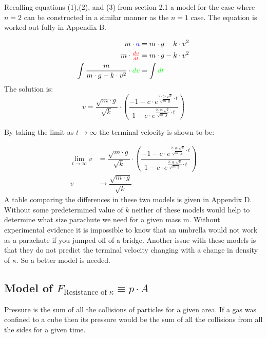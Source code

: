 \documentclass[12pt,letterpaper,final]{article}
\begin{document}
Recalling equations (1),(2), and (3) from section 2.1 a model for the case where $n = 2$ can be constructed in a similar manner as the $n = 1$ case. The equation is worked out fully in Appendix B.

\begin{equation}
\begin{align}
						m \cdot \color{blue}a\color{black} &= m \cdot g - k \cdot v^{2}\\
m\cdot \color{red}\tfrac{dv}{dt}\color{black} &= m \cdot g - k \cdot v^{2}\\
\int\dfrac{m}{m \cdot g - k \cdot v^{2}}\cdot \color{green}dv\color{black} &= \int \color{green}dt\color{black}\\
\end{align}
\end{equation}
The solution is:
\begin{equation}
v = \dfrac{\sqrt{m \cdot g}}{\sqrt{k}}\cdot \left(\dfrac{-1 - c \cdot\textit{e}^{\tfrac{2\cdot g \cdot\sqrt{k}}{\sqrt{m \cdot g}}\cdot t}}{1 - c \cdot\textit{e}^{\tfrac{2\cdot g \cdot\sqrt{k}}{\sqrt{m \cdot g}}\cdot t}}\right)
\end{equation}

By taking the limit as $t \to \infty$ the terminal velocity is shown to be:

\begin{equation}
\begin{align}
\lim_{t \to \infty} v &= \dfrac{\sqrt{m \cdot g}}{\sqrt{k}}\cdot \left(\dfrac{-1 - c \cdot\textit{e}^{\tfrac{2\cdot g \cdot\sqrt{k}}{\sqrt{m \cdot g}}\cdot t}}{1 - c \cdot\textit{e}^{\tfrac{2\cdot g \cdot\sqrt{k}}{\sqrt{m \cdot g}}\cdot t}}\right)\\
v &\to \dfrac{\sqrt{m \cdot g}}{\sqrt{k}}
\end{align}
\end{equation}
A table comparing the differences in these two models is given in Appendix D. Without some predetermined value of $k$ neither of these models would help to determine what size parachute we need for a given mass m. Without experimental evidence it is impossible to know that an umbrella would not work as a parachute if you jumped off of a bridge. Another issue with these models is that they do not predict the terminal velocity changing with a change in density of $\kappa$. So a better model is needed.

\subsection{Model of $F_{\text{Resistance of }\kappa} \equiv p \cdot A$}
Pressure is the sum of all the collisions of particles for a given area. If a gas was confined to a cube then its pressure would be the sum of all the collisions from all the sides for a given time.\\
\end{document}
